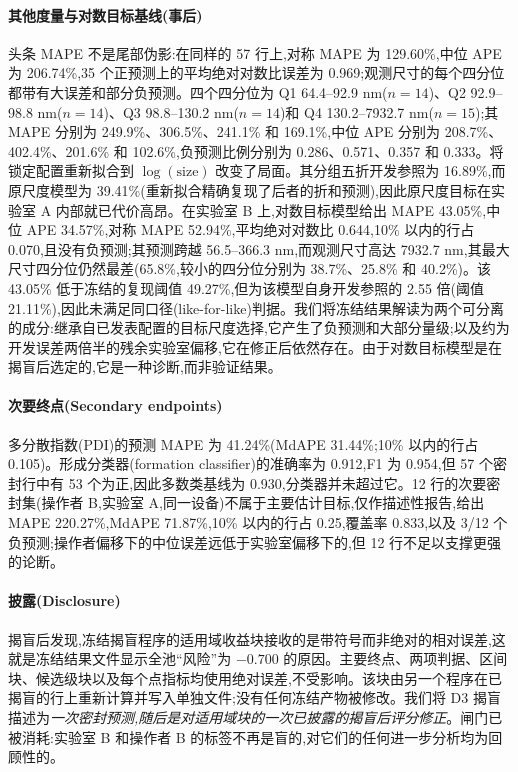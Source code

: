 \documentclass[11pt,a4paper]{ctexart}
\begin{document}
\paragraph{其他度量与对数目标基线(事后)} 头条 MAPE 不是尾部伪影:在同样的 57 行上,对称 MAPE 为 129.60\%,中位 APE 为 206.74\%,35 个正预测上的平均绝对对数比误差为 0.969;观测尺寸的每个四分位都带有大误差和部分负预测。四个四分位为 Q1 64.4–92.9 nm($n=14$)、Q2 92.9–98.8 nm($n=14$)、Q3 98.8–130.2 nm($n=14$)和 Q4 130.2–7932.7 nm($n=15$);其 MAPE 分别为 249.9\%、306.5\%、241.1\% 和 169.1\%,中位 APE 分别为 208.7\%、402.4\%、201.6\% 和 102.6\%,负预测比例分别为 0.286、0.571、0.357 和 0.333。将锁定配置重新拟合到 $\log(\mathrm{size})$ 改变了局面。其分组五折开发参照为 16.89\%,而原尺度模型为 39.41\%(重新拟合精确复现了后者的折和预测),因此原尺度目标在实验室 A 内部就已代价高昂。在实验室 B 上,对数目标模型给出 MAPE 43.05\%,中位 APE 34.57\%,对称 MAPE 52.94\%,平均绝对对数比 0.644,10\% 以内的行占 0.070,且没有负预测;其预测跨越 56.5–366.3 nm,而观测尺寸高达 7932.7 nm,其最大尺寸四分位仍然最差(65.8\%,较小的四分位分别为 38.7\%、25.8\% 和 40.2\%)。该 43.05\% 低于冻结的复现阈值 49.27\%,但为该模型自身开发参照的 2.55 倍(阈值 21.11\%),因此未满足同口径(like-for-like)判据。我们将冻结结果解读为两个可分离的成分:继承自已发表配置的目标尺度选择,它产生了负预测和大部分量级;以及约为开发误差两倍半的残余实验室偏移,它在修正后依然存在。由于对数目标模型是在揭盲后选定的,它是一种诊断,而非验证结果。

\paragraph{次要终点(Secondary endpoints)} 多分散指数(PDI)的预测 MAPE 为 41.24\%(MdAPE 31.44\%;10\% 以内的行占 0.105)。形成分类器(formation classifier)的准确率为 0.912,F1 为 0.954,但 57 个密封行中有 53 个为正,因此多数类基线为 0.930,分类器并未超过它。12 行的次要密封集(操作者 B,实验室 A,同一设备)不属于主要估计目标,仅作描述性报告,给出 MAPE 220.27\%,MdAPE 71.87\%,10\% 以内的行占 0.25,覆盖率 0.833,以及 3/12 个负预测;操作者偏移下的中位误差远低于实验室偏移下的,但 12 行不足以支撑更强的论断。

\paragraph{披露(Disclosure)} 揭盲后发现,冻结揭盲程序的适用域收益块接收的是带符号而非绝对的相对误差,这就是冻结结果文件显示全池“风险”为 $-0.700$ 的原因。主要终点、两项判据、区间块、候选级块以及每个点指标均使用绝对误差,不受影响。该块由另一个程序在已揭盲的行上重新计算并写入单独文件;没有任何冻结产物被修改。我们将 D3 揭盲描述为\emph{一次密封预测,随后是对适用域块的一次已披露的揭盲后评分修正}。闸门已被消耗:实验室 B 和操作者 B 的标签不再是盲的,对它们的任何进一步分析均为回顾性的。
\end{document}
